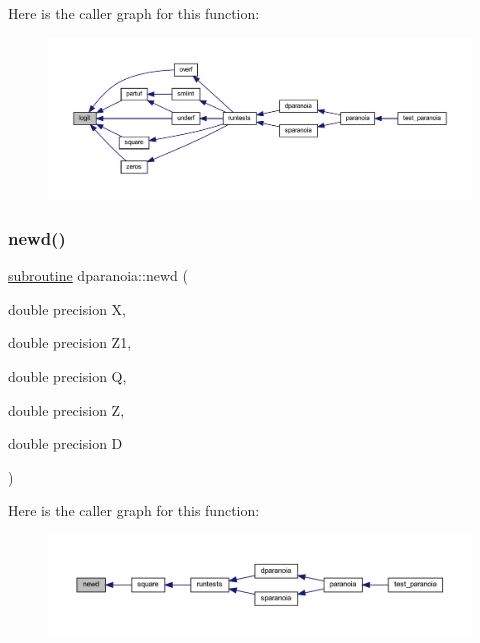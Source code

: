 Here is the caller graph for this function\+:
\nopagebreak
\begin{figure}[H]
\begin{center}
\leavevmode
\includegraphics[width=350pt]{dparanoia_8f90_a6de1ce1dafc6660e6e63be69dfff7d05_icgraph}
\end{center}
\end{figure}
\mbox{\label{dparanoia_8f90_a5d9856a5c97c16ac70359378093a4b4b}} 
\subsubsection{\texorpdfstring{newd()}{newd()}}
{\footnotesize\ttfamily \hyperlink{M__stopwatch_83_8txt_acfbcff50169d691ff02d4a123ed70482}{subroutine} dparanoia\+::newd (\begin{DoxyParamCaption}\item[{double precision}]{X,  }\item[{double precision}]{Z1,  }\item[{double precision}]{Q,  }\item[{double precision}]{Z,  }\item[{double precision}]{D }\end{DoxyParamCaption})}

Here is the caller graph for this function\+:
\nopagebreak
\begin{figure}[H]
\begin{center}
\leavevmode
\includegraphics[width=350pt]{dparanoia_8f90_a5d9856a5c97c16ac70359378093a4b4b_icgraph}
\end{center}
\end{figure}
\mbox{\label{dparanoia_8f90_afbcfc57adfa91735066899a4f2bc8637}} 
